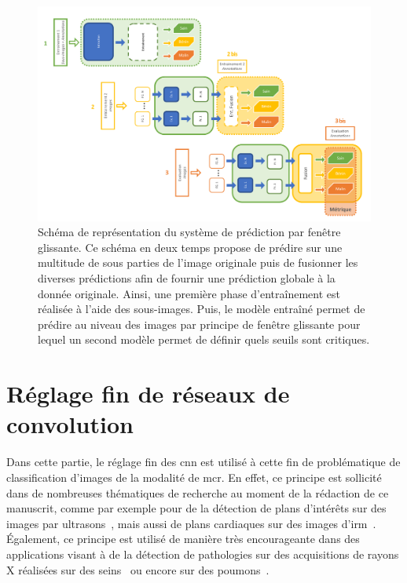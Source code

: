 \begin{landscape}
\begin{figure}[H]
    \centering
    \includegraphics[width=0.8\linewidth]{contents/chapter_6/resources/scheme_image_improvement_sliding_features.pdf}
    \caption{Schéma de représentation du système de prédiction par fenêtre glissante. Ce schéma en deux temps propose de prédire sur une multitude de sous parties de l'image originale puis de fusionner les diverses prédictions afin de fournir une prédiction globale à la donnée originale. Ainsi, une première phase d'entraînement est réalisée à l'aide des sous-images. Puis, le modèle entraîné permet de prédire au niveau des images par principe de fenêtre glissante pour lequel un second modèle permet de définir quels seuils sont critiques.}
    \label{fig:scheme_image_improvement_sliding_features}
\end{figure}\par
\end{landscape}

\section{Réglage fin de réseaux de convolution}
Dans cette partie, le réglage fin des \gls{cnn} est utilisé à cette fin de problématique de classification d'images de la modalité de \gls{mcr}. En effet, ce principe est sollicité dans de nombreuses thématiques de recherche au moment de la rédaction de ce manuscrit, comme par exemple pour de la détection de plans d'intérêts sur des images par ultrasons~\cite{Chen2015}, mais aussi de plans cardiaques sur des images d'\gls{irm}~\cite{Margeta2015}. Également, ce principe est utilisé de manière très encourageante dans des applications visant à de la détection de pathologies sur des acquisitions de rayons X réalisées sur des seins~\cite{Lotter2017} ou encore sur des poumons~\cite{Gao2016}.\par


